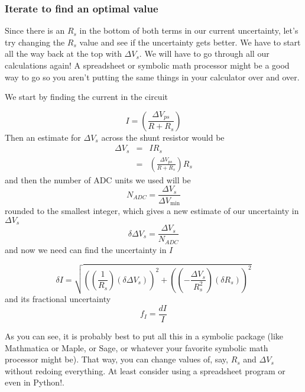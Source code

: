 \subsubsection{Iterate to find an optimal value}

Since there is an $R_{s}$ in the bottom of both terms in our current
uncertainty, let's try changing the $R_{s}$ value and see if the uncertainty
gets better. We have to start all the way back at the top with $\Delta
V_{s}. $ We will have to go through all our calculations again! A
spreadsheet or symbolic math processor might be a good way to go so you
aren't putting the same things in your calculator over and over.

We start by finding the current in the circuit

\begin{equation*}
I=\left( \frac{\Delta V_{ps}}{R+R_{s}}\right)
\end{equation*}%
Then an estimate for $\Delta V_{s}$ across the shunt resistor would be%
\begin{eqnarray*}
\Delta V_{s} &=&IR_{s} \\
&=&\left( \frac{\Delta V_{ps}}{R+R_{s}}\right) R_{s}
\end{eqnarray*}%
and then the number of ADC units we used will be 
\begin{equation*}
N_{ADC}=\frac{\Delta V_{s}}{\Delta V_{\min }}
\end{equation*}%
rounded to the smallest integer, which gives a new estimate of our
uncertainty in $\Delta V_{s}$ 
\begin{equation*}
\delta \Delta V_{s}=\frac{\Delta V_{s}}{N_{ADC}}
\end{equation*}%
and now we need can find the uncertainty in $I$

\begin{equation*}
\delta I=\sqrt{\left( \left( \frac{1}{R_{s}}\right) \left( \delta \Delta
V_{s}\right) \right) ^{2}+\left( \left( -\frac{\Delta V_{s}}{R_{s}^{2}}%
\right) \left( \delta R_{s}\right) \right) ^{2}}
\end{equation*}%
and its fractional uncertainty%
\begin{equation*}
f_{I}=\frac{dI}{I}
\end{equation*}

As you can see, it is probably best to put all this in a symbolic package
(like Mathmatica or Maple, or Sage, or whatever your favorite symbolic math
processor might be). That way, you can change values of, say, $R_{s}$ and $%
\Delta V_{s}$ without redoing everything. At least consider using a
spreadsheet program or even in Python!.

